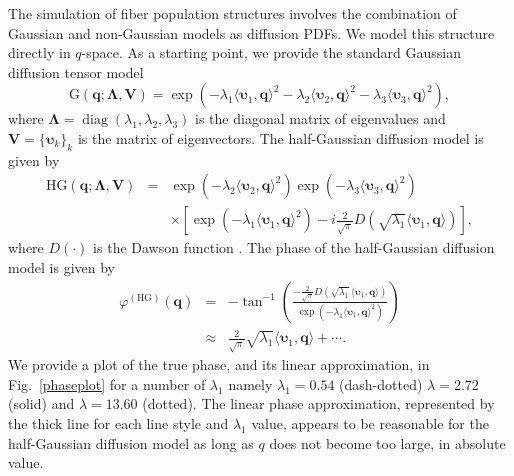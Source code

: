 \documentclass[authoryear,preprint,12pt]{elsarticle}
\DeclareMathOperator*{\diag}{diag}
\newcommand{\q}{\mathbf{q}}
\newcommand{\bsL}{\bs{\Lambda}}
\newcommand{\bsu}{\bs{\upsilon}}
\newcommand{\bld}[1]{\mathbf{#1}}
\newcommand{\bs}[1]{\boldsymbol{#1}}
\begin{document}
The simulation of fiber population structures involves the combination
of Gaussian and non-Gaussian models as diffusion PDFs.  We model this
structure directly in $q$-space.  As a starting point, we provide the
standard Gaussian diffusion tensor model
\begin{equation}\label{GaussianDTI}
  \text{G}(\q;\bsL,\bld{V}) = \exp\left(-\lambda_1\langle\bsu_1,
  \q\rangle^2-\lambda_2 \langle\bsu_2,
  \q\rangle^2-\lambda_3\langle\bsu_3, \q\rangle^2\right),
\end{equation} 
where $\bsL=\diag(\lambda_1,\lambda_2,\lambda_3)$ is the diagonal
matrix of eigenvalues and $\bld{V}=\{\bsu_k\}_k$ is the matrix of
eigenvectors.  The half-Gaussian diffusion model is given by
\begin{eqnarray}
  \nonumber
  \text{HG}(\q;\bsL,\bld{V}) &=&
  \exp\left(-\lambda_2\langle\bsu_2,\q\rangle^2\right)
  \exp\left(-\lambda_3\langle\bsu_3,\q\rangle^2\right)\\
  & & \times\left[\exp\left(-\lambda_1\langle\bsu_1,\q\rangle^2\right)
  - i \frac{2}{\sqrt{\pi}} D\left(\sqrt{\lambda_1}\langle \bsu_1, \q
  \rangle\right)\right],
  \label{Dawson}
\end{eqnarray}
where $D(\cdot)$ is the Dawson function \citep{abra}.  The phase of
the half-Gaussian diffusion model is given by
\begin{eqnarray}\label{angle:halfG}
  \varphi^{(\text{HG})}(\q) &=& -\tan^{-1}
  \left(\frac{-\frac{2}{\sqrt{\pi}} D\left(\sqrt{\lambda_1}
  \langle\bsu_1, \q \rangle\right)} {\exp\left(-\lambda_1\langle\bsu_1, \q\rangle^2\right)}\right)\\
  &\approx & \frac{2}{\sqrt{\pi}}\sqrt{\lambda_1}\langle \bsu_1, \q
  \rangle + \cdots.
\end{eqnarray}
We provide a plot of the true phase, and its linear approximation, in
Fig.~\ref{phaseplot} for a number of $\lambda_1$ namely
$\lambda_1=0.54$ (dash-dotted) $\lambda=2.72$ (solid) and
$\lambda=13.60$ (dotted).  The linear phase approximation, represented
by the thick line for each line style and $\lambda_1$ value, appears
to be reasonable for the half-Gaussian diffusion model as long as $q$
does not become too large, in absolute value.
\end{document}
